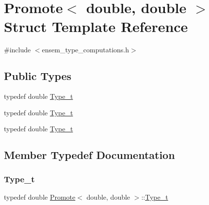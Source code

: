 \hypertarget{structPromote_3_01double_00_01double_01_4}{}\section{Promote$<$ double, double $>$ Struct Template Reference}
\label{structPromote_3_01double_00_01double_01_4}


{\ttfamily \#include $<$ensem\+\_\+type\+\_\+computations.\+h$>$}

\subsection*{Public Types}
\begin{DoxyCompactItemize}
\item 
typedef double \mbox{\hyperlink{structPromote_3_01double_00_01double_01_4_a1183eb3c61824b2ad80a7c7e7524974a}{Type\+\_\+t}}
\item 
typedef double \mbox{\hyperlink{structPromote_3_01double_00_01double_01_4_a1183eb3c61824b2ad80a7c7e7524974a}{Type\+\_\+t}}
\item 
typedef double \mbox{\hyperlink{structPromote_3_01double_00_01double_01_4_a1183eb3c61824b2ad80a7c7e7524974a}{Type\+\_\+t}}
\end{DoxyCompactItemize}


\subsection{Member Typedef Documentation}
\mbox{\label{structPromote_3_01double_00_01double_01_4_a1183eb3c61824b2ad80a7c7e7524974a}} 
\subsubsection{\texorpdfstring{Type\_t}{Type\_t}\hspace{0.1cm}{\footnotesize\ttfamily [1/3]}}
{\footnotesize\ttfamily typedef double \mbox{\hyperlink{structPromote}{Promote}}$<$ double, double $>$\+::\mbox{\hyperlink{structPromote_3_01double_00_01double_01_4_a1183eb3c61824b2ad80a7c7e7524974a}{Type\+\_\+t}}}

\mbox{\label{structPromote_3_01double_00_01double_01_4_a1183eb3c61824b2ad80a7c7e7524974a}} 
